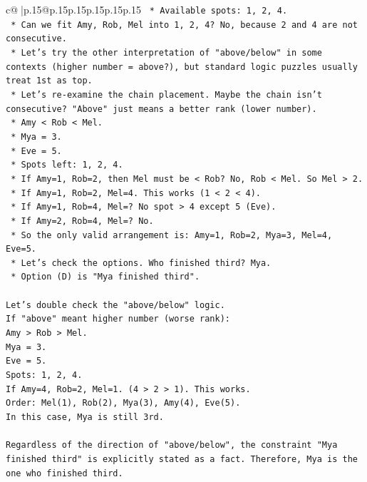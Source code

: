 \documentclass{article}
\begin{document}
{\begin{supertabular}{c@{$\;$}|p{.15\linewidth}@{}p{.15\linewidth}p{.15\linewidth}p{.15\linewidth}p{.15\linewidth}p{.15\linewidth}}
{{{\texttt{        *   Available spots: 1, 2, 4.} \\
\texttt{        *   Can we fit Amy, Rob, Mel into 1, 2, 4? No, because 2 and 4 are not consecutive.} \\
\texttt{    *   Let's try the other interpretation of "above/below" in some contexts (higher number = above?), but standard logic puzzles usually treat 1st as top.} \\
\texttt{    *   Let's re{-}examine the chain placement. Maybe the chain isn't consecutive? "Above" just means a better rank (lower number).} \\
\texttt{        *   Amy < Rob < Mel.} \\
\texttt{        *   Mya = 3.} \\
\texttt{        *   Eve = 5.} \\
\texttt{        *   Spots left: 1, 2, 4.} \\
\texttt{        *   If Amy=1, Rob=2, then Mel must be < Rob? No, Rob < Mel. So Mel > 2.} \\
\texttt{        *   If Amy=1, Rob=2, Mel=4. This works (1 < 2 < 4).} \\
\texttt{        *   If Amy=1, Rob=4, Mel=? No spot > 4 except 5 (Eve).} \\
\texttt{        *   If Amy=2, Rob=4, Mel=? No.} \\
\texttt{        *   So the only valid arrangement is: Amy=1, Rob=2, Mya=3, Mel=4, Eve=5.} \\
\texttt{    *   Let's check the options. Who finished third? Mya.} \\
\texttt{    *   Option (D) is "Mya finished third".} \\
\\ 
\texttt{Let's double check the "above/below" logic.} \\
\texttt{If "above" meant higher number (worse rank):} \\
\texttt{Amy > Rob > Mel.} \\
\texttt{Mya = 3.} \\
\texttt{Eve = 5.} \\
\texttt{Spots: 1, 2, 4.} \\
\texttt{If Amy=4, Rob=2, Mel=1. (4 > 2 > 1). This works.} \\
\texttt{Order: Mel(1), Rob(2), Mya(3), Amy(4), Eve(5).} \\
\texttt{In this case, Mya is still 3rd.} \\
\\ 
\texttt{Regardless of the direction of "above/below", the constraint "Mya finished third" is explicitly stated as a fact. Therefore, Mya is the one who finished third.} \\
}}}
\end{supertabular}}
\end{document}
